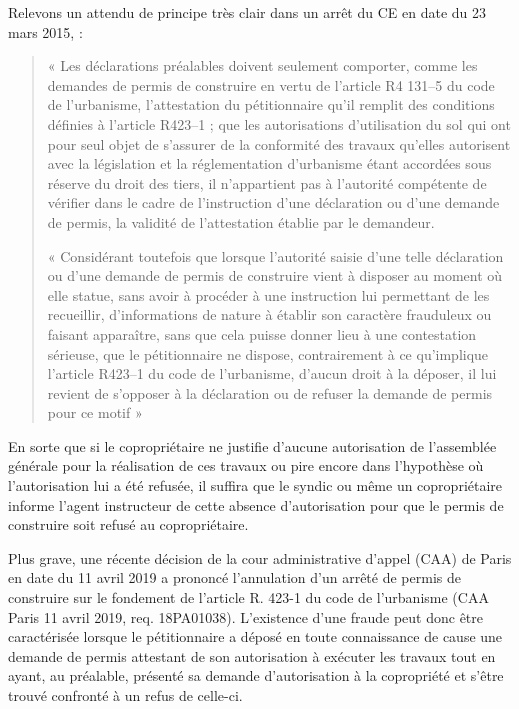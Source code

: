 				Relevons un attendu de principe très clair dans un arrêt du CE en date du 23 mars 2015,  :
				\begin{quote}
					« Les déclarations préalables doivent seulement comporter, comme les demandes de permis de construire en vertu de l’article R4 131–5 du code de l’urbanisme, l’attestation du pétitionnaire qu’il remplit des conditions définies à l’article R423–1 ; que les autorisations d’utilisation du sol qui ont pour seul objet de s’assurer de la conformité des travaux qu’elles autorisent avec la législation et la réglementation d’urbanisme étant accordées sous réserve du droit des tiers, il n’appartient pas à l’autorité compétente de vérifier dans le cadre de l’instruction d’une déclaration ou d’une demande de permis, la validité de l’attestation établie par le demandeur.
					
					« Considérant toutefois que lorsque l’autorité saisie d’une telle déclaration ou d’une demande de permis de construire vient à disposer au moment où elle statue, sans avoir à procéder à une instruction lui permettant de les recueillir, d’informations de nature à établir son caractère frauduleux ou faisant apparaître, sans que cela puisse donner lieu à une contestation sérieuse, que le pétitionnaire ne dispose, contrairement à ce qu’implique l’article R423–1 du code de l’urbanisme, d’aucun droit à la déposer, il lui revient de s’opposer à la déclaration ou de refuser la demande de permis pour ce motif »
				\end{quote}
				
				En sorte que si le copropriétaire ne justifie d’aucune autorisation de l’assemblée générale pour la réalisation de ces travaux ou pire encore dans l’hypothèse où l’autorisation lui a été refusée, il suffira que le syndic ou même un copropriétaire informe l’agent instructeur de cette absence d’autorisation pour que le permis de construire soit refusé au copropriétaire.
				
				Plus grave, une récente décision de la cour administrative d’appel (CAA) de Paris en date du 11 avril 2019 a prononcé l’annulation d’un arrêté de permis de construire sur le fondement de l’article R. 423-1 du code de l’urbanisme (CAA Paris 11 avril 2019, req. \no 18PA01038). L’existence d’une fraude peut donc être caractérisée lorsque le pétitionnaire a déposé en toute connaissance de cause une demande de permis attestant de son autorisation à exécuter les travaux tout en ayant, au préalable, présenté sa demande d’autorisation à la copropriété et s’être trouvé confronté à un refus de celle-ci.
				
